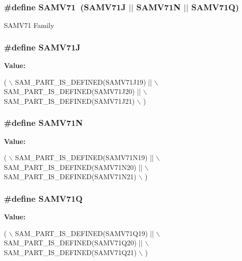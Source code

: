 \subsubsection[{S\+A\+M\+V71}]{\setlength{\rightskip}{0pt plus 5cm}\#define S\+A\+M\+V71~(S\+A\+M\+V71\+J $\vert$$\vert$ S\+A\+M\+V71\+N $\vert$$\vert$ S\+A\+M\+V71\+Q)}\label{group__sam__part__macros__group_ga3244695e750cd101d85bdfbc8802c5e9}
S\+A\+M\+V71 Family \hypertarget{group__sam__part__macros__group_gaec1e3ef31d457e77f20063cdde7e13b9}{}
\subsubsection[{S\+A\+M\+V71\+J}]{\setlength{\rightskip}{0pt plus 5cm}\#define S\+A\+M\+V71\+J}\label{group__sam__part__macros__group_gaec1e3ef31d457e77f20063cdde7e13b9}
{\bfseries Value\+:}
\begin{DoxyCode}
( \(\backslash\)
        SAM\_PART\_IS\_DEFINED(SAMV71J19) || \(\backslash\)
        SAM\_PART\_IS\_DEFINED(SAMV71J20) || \(\backslash\)
        SAM\_PART\_IS\_DEFINED(SAMV71J21) \(\backslash\)
    )
\end{DoxyCode}
\hypertarget{group__sam__part__macros__group_ga8688ea299fbe00f831b4e569cf1c742c}{}
\subsubsection[{S\+A\+M\+V71\+N}]{\setlength{\rightskip}{0pt plus 5cm}\#define S\+A\+M\+V71\+N}\label{group__sam__part__macros__group_ga8688ea299fbe00f831b4e569cf1c742c}
{\bfseries Value\+:}
\begin{DoxyCode}
( \(\backslash\)
        SAM\_PART\_IS\_DEFINED(SAMV71N19) || \(\backslash\)
        SAM\_PART\_IS\_DEFINED(SAMV71N20) || \(\backslash\)
        SAM\_PART\_IS\_DEFINED(SAMV71N21) \(\backslash\)
    )
\end{DoxyCode}
\hypertarget{group__sam__part__macros__group_ga1abe2ffaaf3eebef08978f55ed456a5c}{}
\subsubsection[{S\+A\+M\+V71\+Q}]{\setlength{\rightskip}{0pt plus 5cm}\#define S\+A\+M\+V71\+Q}\label{group__sam__part__macros__group_ga1abe2ffaaf3eebef08978f55ed456a5c}
{\bfseries Value\+:}
\begin{DoxyCode}
( \(\backslash\)
        SAM\_PART\_IS\_DEFINED(SAMV71Q19) || \(\backslash\)
        SAM\_PART\_IS\_DEFINED(SAMV71Q20) || \(\backslash\)
        SAM\_PART\_IS\_DEFINED(SAMV71Q21) \(\backslash\)
    )
\end{DoxyCode}
